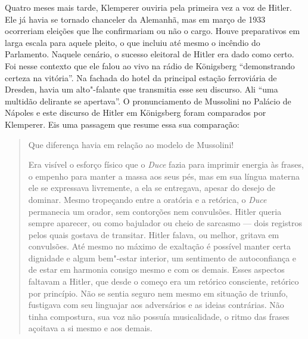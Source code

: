 Quatro meses mais tarde, Klemperer ouviria pela primeira vez a voz de
Hitler. Ele já havia se tornado chanceler da Alemanhã, mas em março de
1933 ocorreriam eleições que lhe confirmariam ou não o cargo. Houve
preparativos em larga escala para aquele pleito, o que incluiu até mesmo
o incêndio do Parlamento. Naquele cenário, o sucesso eleitoral de Hitler
era dado como certo. Foi nesse contexto que ele falou ao vivo na rádio
de Königsberg ``demonstrando certeza na vitória''. Na fachada do hotel
da principal estação ferroviária de Dresden, havia um alto"-falante que
transmitia esse seu discurso. Ali ``uma multidão delirante se
apertava''. O pronunciamento de Mussolini no Palácio de Nápoles e este
discurso de Hitler em Königsberg foram comparados por Klemperer. Eis uma
passagem que resume essa sua comparação:

\begin{quote}
Que diferença havia em relação ao modelo de Mussolini!

Era visível o esforço físico que o \emph{Duce} fazia para imprimir
energia às frases, o empenho para manter a massa aos seus pés, mas em
sua língua materna ele se expressava livremente, a ela se entregava,
apesar do desejo de dominar. Mesmo tropeçando entre a oratória e a
retórica, o \emph{Duce} permanecia um orador, sem contorções nem
convulsões. Hitler queria sempre aparecer, ou como bajulador ou cheio de
sarcasmo --- dois registros pelos quais gostava de transitar. Hitler
falava, ou melhor, gritava em convulsões. Até mesmo no máximo de
exaltação é possível manter certa dignidade e algum bem"-estar interior,
um sentimento de autoconfiança e de estar em harmonia consigo mesmo e
com os demais. Esses aspectos faltavam a Hitler, que desde o começo era
um retórico consciente, retórico por princípio. Não se sentia seguro nem
mesmo em situação de triunfo, fustigava com seu linguajar aos
adversários e as ideias contrárias. Não tinha compostura, sua voz não
possuía musicalidade, o ritmo das frases açoitava a si mesmo e aos
demais.
\end{quote}


